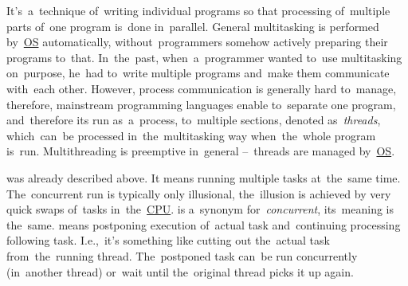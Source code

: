 \label{multithreading}
It's~a~technique of~writing individual programs so that processing of~multiple parts of~one program is~done in~parallel.
General multitasking is performed by~\hyperref[os]{OS} automatically, without~programmers somehow actively preparing their programs to~that.
In~the~past, when~a~programmer wanted to~use multitasking on~purpose, he~had to~write multiple programs and~make them communicate with~each other.
However, process communication is generally hard to~manage, therefore, mainstream programming languages enable to~separate one program, and~therefore its run as~a~process, to~multiple sections, denoted \mbox{as \textit{threads}}, which~can~be processed in~the~multitasking way when~the~whole program is~run.
Multithreading is preemptive in~general --~threads are managed by~\hyperref[os]{OS}.
\newline

\label{concurrentparallelasynchronous}
\begin{itemize}
     was already described above.
            It means running multiple tasks at~the~same time.
            The~concurrent run is typically only illusional, the~illusion is achieved by very quick swaps of~tasks in~the~\hyperref[processorcpucore]{CPU}.
     is a~synonym for~\textit{concurrent}, its~meaning is the~same.
     means postponing execution of~actual task and~continuing processing following task.
            I.e.,~it's something like cutting out the~actual task from~the~running thread.
            The~postponed task can~be run concurrently (in~another thread) or~wait until the~original thread picks it up again.
\end{itemize}
\newline
